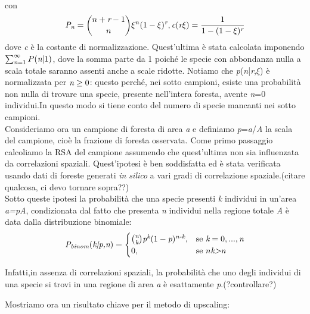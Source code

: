 \\
con 
\begin{equation}
    \emph{P}_\emph{n}=\binom{n+\emph{r}-1}{n}\xi^n(1-\xi)^{\emph{r}},      
    \emph{c}(\emph{r}\xi)=\frac{1}{1-(1-\xi)^{\emph{r}}}
\end{equation}
dove \emph{c} è la costante di normalizzazione.
Quest'ultima è stata calcolata imponendo $\sum_{\emph{n}=1}^\infty P(\emph{n}|1)$, dove la somma parte da 1 poiché le specie con abbondanza nulla a scala totale saranno assenti anche a scale ridotte.
Notiamo che \emph{p}(\emph{n}|\emph{r},$\xi$) è normalizzata per $\emph{n}\ge0$: questo perché, nei sotto campioni, esiste una probabilità non nulla di trovare una specie, presente nell'intera foresta, avente \emph{n}=0 individui.In questo modo si tiene conto del numero di specie mancanti nei sotto campioni.\\
Consideriamo ora un campione di foresta di area \emph{a} e definiamo \emph{p}=\emph{a}/\emph{A} la scala del campione, cioè la frazione di foresta osservata.
Come primo passaggio calcoliamo la RSA del campione assumendo che quest'ultima non sia influenzata da correlazioni spaziali. Quest'ipotesi è ben soddisfatta ed è stata verificata usando dati di foreste generati \emph{in silico} a vari gradi di correlazione spaziale.(citare qualcosa, ci devo tornare sopra??)\\
Sotto queste ipotesi la probabilità che una specie presenti \emph{k} individui in un'area \emph{a=pA}, condizionata dal fatto che presenta \emph{n} individui nella regione totale \emph{A} è data dalla distribuzione binomiale:
\begin{equation}
\emph{P}_\emph{binom}(\emph{k|p,n})=\begin{cases} \binom{\emph{n}}{\emph{k}}\emph{p}^\emph{k}(1-\emph{p})^{\emph{n-k}}, & \mbox{se }\emph{k}=0,...,\emph{n} \\ 0, & \mbox{se }n\mbox{\emph{k>n}}
\end{cases}
\end{equation}

Infatti,in assenza di correlazioni spaziali, la probabilità che uno degli individui di una specie si trovi in una regione di area \emph{a} è esattamente \emph{p}.(?controllare?)

Mostriamo ora un risultato chiave per il metodo di upscaling:
